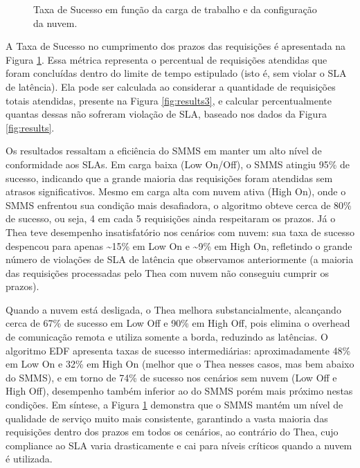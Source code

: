\begin{figure}[ht!]
    \caption{Taxa de Sucesso em função da carga de trabalho e da configuração da nuvem.}
    \label{fig:results5}
\end{figure}

A Taxa de Sucesso no cumprimento dos prazos das requisições é apresentada na Figura \ref{fig:results5}. Essa métrica representa o percentual de requisições atendidas que foram concluídas dentro do limite de tempo estipulado (isto é, sem violar o SLA de latência). Ela pode ser calculada ao considerar a quantidade de requisições totais atendidas, presente na Figura \ref{fig:results3}, e calcular percentualmente quantas dessas não sofreram violação de SLA, baseado nos dados da Figura \ref{fig:results}.

Os resultados ressaltam a eficiência do SMMS em manter um alto nível de conformidade aos SLAs. Em carga baixa (Low On/Off), o SMMS atingiu 95\% de sucesso, indicando que a grande maioria das requisições foram atendidas sem atrasos significativos. Mesmo em carga alta com nuvem ativa (High On), onde o SMMS enfrentou sua condição mais desafiadora, o algoritmo obteve cerca de 80\% de sucesso, ou seja, 4 em cada 5 requisições ainda respeitaram os prazos. Já o Thea teve desempenho insatisfatório nos cenários com nuvem: sua taxa de sucesso despencou para apenas \textasciitilde15\% em Low On e \textasciitilde9\% em High On, refletindo o grande número de violações de SLA de latência que observamos anteriormente (a maioria das requisições processadas pelo Thea com nuvem não conseguiu cumprir os prazos).

Quando a nuvem está desligada, o Thea melhora substancialmente, alcançando cerca de 67\% de sucesso em Low Off e 90\% em High Off, pois elimina o overhead de comunicação remota e utiliza somente a borda, reduzindo as latências. O algoritmo EDF apresenta taxas de sucesso intermediárias: aproximadamente 48\% em Low On e 32\% em High On (melhor que o Thea nesses casos, mas bem abaixo do SMMS), e em torno de 74\% de sucesso nos cenários sem nuvem (Low Off e High Off), desempenho também inferior ao do SMMS porém mais próximo nestas condições. Em síntese, a Figura \ref{fig:results5} demonstra que o SMMS mantém um nível de qualidade de serviço muito mais consistente, garantindo a vasta maioria das requisições dentro dos prazos em todos os cenários, ao contrário do Thea, cujo compliance ao SLA varia drasticamente e cai para níveis críticos quando a nuvem é utilizada.
